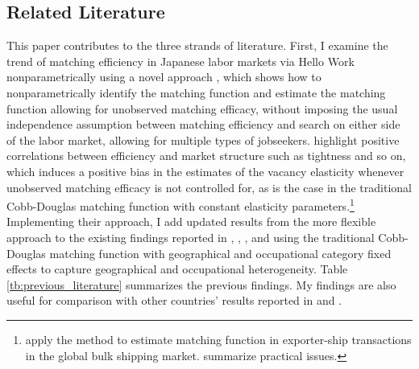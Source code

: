 \documentclass[12pt]{article}
\begin{document}
\subsection{Related Literature}
This paper contributes to the three strands of literature.
First, I examine the trend of matching efficiency in Japanese labor markets via Hello Work nonparametrically using a novel approach \citep{lange2020beyond}, which shows how to nonparametrically identify the matching function and estimate the matching function allowing for unobserved matching efficacy, without imposing the usual independence assumption between matching efficiency and search on either side of the labor market, allowing for multiple types of jobseekers.
\cite{lange2020beyond} highlight positive correlations between efficiency and market structure such as tightness and so on, which induces a positive bias in the estimates of the vacancy elasticity whenever unobserved matching efficacy is not controlled for, as is the case in the traditional Cobb-Douglas matching function with constant elasticity parameters.\footnote{\cite{brancaccio2020geography,brancaccio2023search} apply the method to estimate matching function in exporter-ship transactions in the global bulk shipping market. \cite{brancaccio2020guide} summarize practical issues.} 
Implementing their approach, I add updated results from the more flexible approach to the existing findings reported in \cite{kano2005estimating}, \cite{kambayashi2006vacancy}, \cite{sasaki2008matching}, and \cite{higashi2018spatial} using the traditional Cobb-Douglas matching function with geographical and occupational category fixed effects to capture geographical and occupational heterogeneity.
Table \ref{tb:previous_literature} summarizes the previous findings.
My findings are also useful for comparison with other countries' results reported in \cite{bernstein2022matching} and \cite{petrongolo2001looking}.
\end{document}
